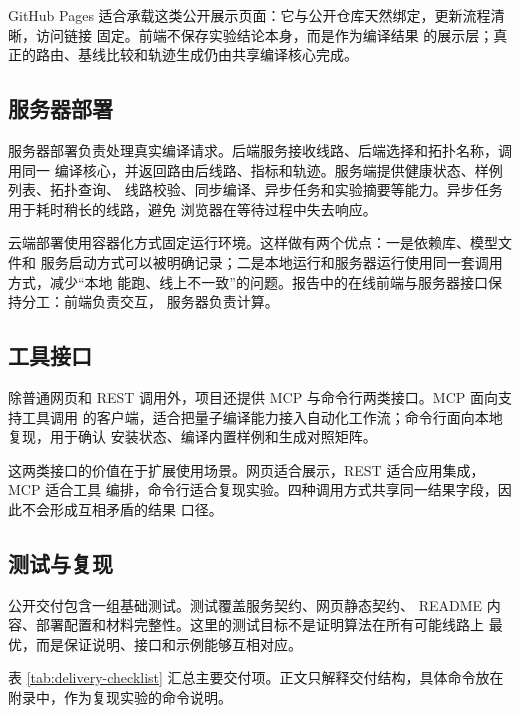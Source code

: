 GitHub Pages 适合承载这类公开展示页面：它与公开仓库天然绑定，更新流程清晰，访问链接
固定。前端不保存实验结论本身，而是作为编译结果
的展示层；真正的路由、基线比较和轨迹生成仍由共享编译核心完成。

\subsection{服务器部署}

服务器部署负责处理真实编译请求。后端服务接收线路、后端选择和拓扑名称，调用同一
编译核心，并返回路由后线路、指标和轨迹。服务端提供健康状态、样例列表、拓扑查询、
线路校验、同步编译、异步任务和实验摘要等能力。异步任务用于耗时稍长的线路，避免
浏览器在等待过程中失去响应。

云端部署使用容器化方式固定运行环境。这样做有两个优点：一是依赖库、模型文件和
服务启动方式可以被明确记录；二是本地运行和服务器运行使用同一套调用方式，减少“本地
能跑、线上不一致”的问题。报告中的在线前端与服务器接口保持分工：前端负责交互，
服务器负责计算。

\subsection{工具接口}

除普通网页和 REST 调用外，项目还提供 MCP 与命令行两类接口。MCP 面向支持工具调用
的客户端，适合把量子编译能力接入自动化工作流；命令行面向本地复现，用于确认
安装状态、编译内置样例和生成对照矩阵。

这两类接口的价值在于扩展使用场景。网页适合展示，REST 适合应用集成，MCP 适合工具
编排，命令行适合复现实验。四种调用方式共享同一结果字段，因此不会形成互相矛盾的结果
口径。

\subsection{测试与复现}

公开交付包含一组基础测试。测试覆盖服务契约、网页静态契约、
README 内容、部署配置和材料完整性。这里的测试目标不是证明算法在所有可能线路上
最优，而是保证说明、接口和示例能够互相对应。

表 \ref{tab:delivery-checklist} 汇总主要交付项。正文只解释交付结构，具体命令放在
附录中，作为复现实验的命令说明。


